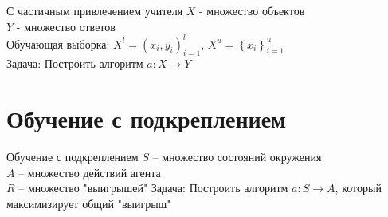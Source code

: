 \documentclass[10pt]{beamer}
\begin{document}
{
\begin{frame}{С частичным привлечением учителя}
  $X$ - множество объектов \\
	$Y$ - множество ответов \\
	Обучающая выборка: ${X^l = (x_i, y_i)_{i=1}^l}$, ${X^u = \left\{x_i\right\}_{i=1}^u}$ \\  
	\bigbreak
	\bigbreak
	\alert{Задача}: Построить алгоритм ${a \colon X \rightarrow Y}$
\end{frame}
}

\section{Обучение с подкреплением}

{
\begin{frame} {Обучение с подкреплением}
  $S$ -- множество состояний окружения\\
  $A$ -- множество действий агента\\
  $R$ -- множество "выигрышей"
  \bigbreak
	\bigbreak
	\alert{Задача}: Построить алгоритм ${a \colon S \rightarrow A}$, который максимизирует общий "выигрыш"
\end{frame}
}
\end{document}
